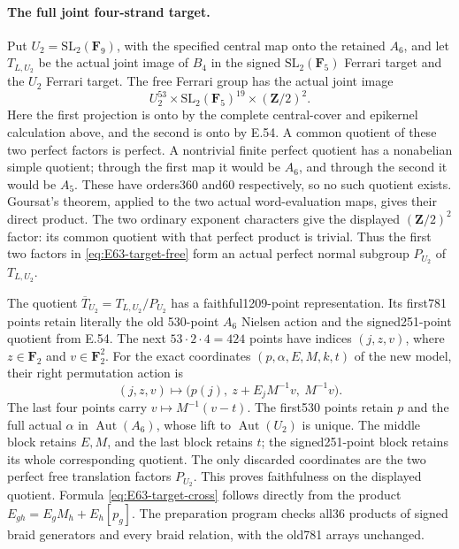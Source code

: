 \paragraph{The full joint four-strand target.}
Put $U_2=\mathrm{SL}_2(\mathbf F_9)$, with the specified central
map onto the retained $A_6$, and let $T_{L,U_2}$ be the actual joint
image of $B_4$ in the signed $\mathrm{SL}_2(\mathbf F_5)$ Ferrari
target and the $U_2$ Ferrari target.
The free Ferrari group has the actual joint image
\begin{equation}
 U_2^{53}\times\mathrm{SL}_2(\mathbf F_5)^{19}
       \times(\mathbf Z/2)^2.\tag{E.63.30}\label{eq:E63-target-free}
\end{equation}
Here the first projection is onto by the complete central-cover and
epikernel calculation above, and the second is onto by E.54.
A common quotient of these two perfect factors is perfect.
A nontrivial finite perfect quotient has a nonabelian simple quotient;
through the first map it would be $A_6$, and through the second it would
be $A_5$. These have orders360 and60 respectively, so no such quotient
exists. Goursat's theorem, applied to the two actual word-evaluation
maps, gives their direct product. The two ordinary exponent characters
give the displayed $(\mathbf Z/2)^2$ factor: its common quotient with
that perfect product is trivial. Thus the first two factors in
\eqref{eq:E63-target-free} form an actual perfect normal subgroup
$P_{U_2}$ of $T_{L,U_2}$.

The quotient
$\overline T_{U_2}=T_{L,U_2}/P_{U_2}$ has a faithful1209-point
representation. Its first781 points retain literally the old
530-point $A_6$ Nielsen action and the signed251-point quotient
from E.54. The next $53\cdot2\cdot4=424$ points have indices
$(j,z,v)$, where $z\in\mathbf F_2$ and $v\in\mathbf F_2^2$.
For the exact coordinates $(p,\alpha,E,M,k,t)$ of the new model,
their right permutation action is
\begin{equation}
 (j,z,v)\longmapsto
 \bigl(p(j),\ z+E_jM^{-1}v,\ M^{-1}v\bigr).
 \tag{E.63.31}\label{eq:E63-target-cross}
\end{equation}
The last four points carry $v\mapsto M^{-1}(v-t)$.
The first530 points retain $p$ and the full actual $\alpha$ in
$\operatorname{Aut}(A_6)$, whose lift to $\operatorname{Aut}(U_2)$
is unique. The middle block retains $E,M$, and the last block retains
$t$; the signed251-point block retains its whole corresponding
quotient. The only discarded coordinates are the two perfect free
translation factors $P_{U_2}$. This proves faithfulness on the
displayed quotient. Formula \eqref{eq:E63-target-cross} follows
directly from the product $E_{gh}=E_gM_h+E_h[p_g]$.
The preparation program checks all36 products of signed braid
generators and every braid relation, with the old781 arrays unchanged.

